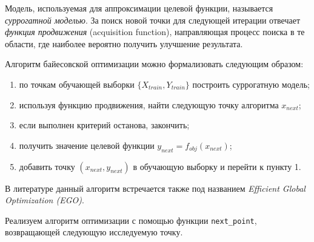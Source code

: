 \documentclass[11pt,a4paper]{article}
\providecommand{\tightlist}{%
      \setlength{\itemsep}{0pt}\setlength{\parskip}{0pt}}
\begin{document}
Модель, используемая для аппроксимации целевой функции, называется
\emph{суррогатной моделью}. За поиск новой точки для следующей итерации
отвечает \emph{функция продвижения} (acquisition function), направляющая
процесс поиска в те области, где наиболее вероятно получить улучшение
результата.

    Алгоритм байесовской оптимизации можно формализовать следующим образом:

\begin{enumerate}
\def\labelenumi{\arabic{enumi}.}
\tightlist
\item
  по точкам обучающей выборки \(\{X_{train}, Y_{train}\}\) построить
  суррогатную модель;
\item
  используя функцию продвижения, найти следующую точку алгоритма
  \(x_{next}\);
\item
  если выполнен критерий останова, закончить;
\item
  получить значение целевой функции \(y_{next} = f_{obj}(x_{next})\);
\item
  добавить точку \((x_{next}, y_{next})\) в обучающую выборку и перейти
  к пункту 1.
\end{enumerate}

В литературе данный алгоритм встречается также под названием
\emph{Efficient Global Optimization (EGO)}.

    Реализуем алгоритм оптимизации с помощью функции \texttt{next\_point},
возвращающей следующую исследуемую точку.
\end{document}
